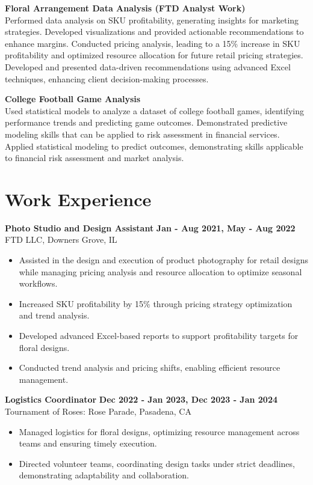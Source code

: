 \documentclass[10pt]{article}
\begin{document}
\vspace{0pt}
\textbf{Floral Arrangement Data Analysis (FTD Analyst Work)} \\
Performed data analysis on SKU profitability, generating insights for marketing strategies. Developed visualizations and provided actionable recommendations to enhance margins. Conducted pricing analysis, leading to a 15\% increase in SKU profitability and optimized resource allocation for future retail pricing strategies. Developed and presented data-driven recommendations using advanced Excel techniques, enhancing client decision-making processes.

\vspace{0pt}
\textbf{College Football Game Analysis} \\
Used statistical models to analyze a dataset of college football games, identifying performance trends and predicting game outcomes. Demonstrated predictive modeling skills that can be applied to risk assessment in financial services. Applied statistical modeling to predict outcomes, demonstrating skills applicable to financial risk assessment and market analysis.

\vspace{-10pt}
\section*{Work Experience}
\vspace{0pt}
\textbf{Photo Studio and Design Assistant} \hfill \textbf{Jan - Aug 2021, May - Aug 2022} \\
FTD LLC, Downers Grove, IL
\begin{itemize}[noitemsep,nosep]
    \item Assisted in the design and execution of product photography for retail designs while managing pricing analysis and resource allocation to optimize seasonal workflows.
    \item Increased SKU profitability by 15\% through pricing strategy optimization and trend analysis.
    \item Developed advanced Excel-based reports to support profitability targets for floral designs.
    \item Conducted trend analysis and pricing shifts, enabling efficient resource management.
\end{itemize}

\vspace{0pt}
\textbf{Logistics Coordinator} \hfill \textbf{Dec 2022 - Jan 2023, Dec 2023 - Jan 2024} \\
Tournament of Roses: Rose Parade, Pasadena, CA
\begin{itemize}[noitemsep,nosep]
    \item Managed logistics for floral designs, optimizing resource management across teams and ensuring timely execution.
    \item Directed volunteer teams, coordinating design tasks under strict deadlines, demonstrating adaptability and collaboration.
\end{itemize}
\end{document}
